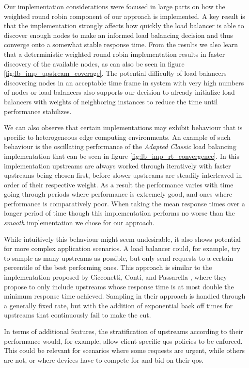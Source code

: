 \documentclass[draft,final]{vutinfth} %
\begin{document}
Our implementation considerations were focused in large parts on how the weighted round robin component of our approach is implemented.
A key result is that the implementation strongly affects how quickly the load balancer is able to discover enough nodes to make an informed load balancing decision and thus converge onto a somewhat stable response time.
From the results we also learn that a deterministic weighted round robin implementation results in faster discovery of the available nodes, as can also be seen in figure \ref{fig:lb_imp_upstream_coverage}.
The potential difficulty of load balancers discovering nodes in an acceptable time frame in system with very high numbers of nodes or load balancers also supports our decision to already initialize load balancers with weights of neighboring instances to reduce the time until performance stabilizes.

We can also observe that certain implementations may exhibit behaviour that is specific to heterogeneous edge computing environments.
An example of such behaviour is the oscillating performance of the \textit{Adapted Classic} load balancing implementation that can be seen in figure \ref{fig:lb_imp_rt_convergence}.
In this implementation upstreams are always worked through iteratively with faster upstreams being chosen first, before slower upstreams are steadily interleaved in order of their respective weight.
As a result the performance varies with time going through periods where performance is extremely  good, and ones where performance is comparatively poor.
When taking the mean response times over a longer period of time though this implementation performs no worse than the \textit{smooth} implementation we chose for our approach.

While intuitively this behaviour might seem undesirable, it also shows potential for more complex application scenarios.
A load balancer could, for example, try to sample as many upstreams as possible, but only send requests to a certain percentile of the best performing ones.
This approach is similar to the implementation proposed by Cicconetti, Conti, and Passarella \cite{cicconettiDecentralizedFrameworkServerless2020}, where they propose to only include upstreams whose response time is at most double the minimum response time achieved.
Sampling in their approach is handled through a generally fixed rate, but with the addition of exponential back off times for upstreams that continuously fail to make the cut.

In terms of additional features, the stratification of upstreams according to their performance would, for example, allow client-specific \gls{qos} policies to be enforced.
This could be relevant for scenarios where some requests are urgent, while others are not, or where devices have to compete for and bid on their \gls{qos}.
\end{document}

